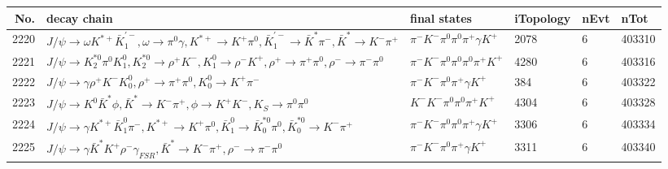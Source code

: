 \begin{table}[htbp] 
\begin{center}
\begin{small}
\begin{tabular}{rlllll}\hline\hline
 No. & decay chain & final states &  iTopology & nEvt & nTot \\\hline
2220&$J/\psi       \rightarrow \omega         K^{*+}         \bar{K}_1^{'-}, \omega          \rightarrow \pi^{0}        \gamma       , K^{*+}          \rightarrow K^{+}          \pi^{0}        , \bar{K}_1^{'-} \rightarrow \bar{K}^{*}   \pi^{-}        , \bar{K}^{*}    \rightarrow K^{-}          \pi^{+}        $&$\pi^{-}        K^{-}          \pi^{0}        \pi^{0}        \pi^{+}        \gamma       K^{+}          $& 2078&    6&403310\\
2221&$J/\psi       \rightarrow K_2^{*0}       \pi^{0}        K_1^{0}        , K_2^{*0}        \rightarrow \rho^{+}      K^{-}          , K_1^{0}         \rightarrow \rho^{-}      K^{+}          , \rho^{+}       \rightarrow \pi^{+}        \pi^{0}        , \rho^{-}       \rightarrow \pi^{-}        \pi^{0}        $&$\pi^{-}        K^{-}          \pi^{0}        \pi^{0}        \pi^{0}        \pi^{+}        K^{+}          $& 4280&    6&403316\\
2222&$J/\psi       \rightarrow \gamma       \rho^{+}      K^{-}          K_0^{0}        , \rho^{+}       \rightarrow \pi^{+}        \pi^{0}        , K_0^{0}         \rightarrow K^{+}          \pi^{-}        $&$\pi^{-}        K^{-}          \pi^{0}        \pi^{+}        \gamma       K^{+}          $&  384&    6&403322\\
2223&$J/\psi       \rightarrow K^{0}          \bar{K}^{*}   \phi           , \bar{K}^{*}    \rightarrow K^{-}          \pi^{+}        , \phi            \rightarrow K^{+}          K^{-}          , K_{S}           \rightarrow \pi^{0}        \pi^{0}        $&$K^{-}          K^{-}          \pi^{0}        \pi^{0}        \pi^{+}        K^{+}          $& 4304&    6&403328\\
2224&$J/\psi       \rightarrow \gamma       K^{*+}         \bar{K}_1^{0} \pi^{-}        , K^{*+}          \rightarrow K^{+}          \pi^{0}        , \bar{K}_1^{0}  \rightarrow \bar{K}_0^{*0}\pi^{0}        , \bar{K}_0^{*0} \rightarrow K^{-}          \pi^{+}        $&$\pi^{-}        K^{-}          \pi^{0}        \pi^{0}        \pi^{+}        \gamma       K^{+}          $& 3306&    6&403334\\
2225&$J/\psi       \rightarrow \gamma       \bar{K}^{*}   K^{+}          \rho^{-}      \gamma_{FSR} , \bar{K}^{*}    \rightarrow K^{-}          \pi^{+}        , \rho^{-}       \rightarrow \pi^{-}        \pi^{0}        $&$\pi^{-}        K^{-}          \pi^{0}        \pi^{+}        \gamma       K^{+}          $& 3311&    6&403340\\

\end{tabular}
\end{small}
\end{center}
\end{table}
